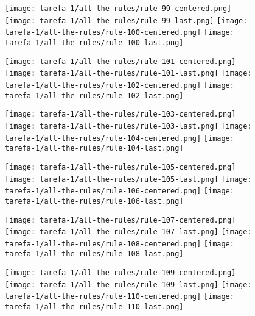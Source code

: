 \begin{figure}[htbp]
  \centering
\texttt{[image: tarefa-1/all-the-rules/rule-99-centered.png]}
\texttt{[image: tarefa-1/all-the-rules/rule-99-last.png]}
\texttt{[image: tarefa-1/all-the-rules/rule-100-centered.png]}
\texttt{[image: tarefa-1/all-the-rules/rule-100-last.png]}
\end{figure}
\begin{figure}[htbp]
  \centering
\texttt{[image: tarefa-1/all-the-rules/rule-101-centered.png]}
\texttt{[image: tarefa-1/all-the-rules/rule-101-last.png]}
\texttt{[image: tarefa-1/all-the-rules/rule-102-centered.png]}
\texttt{[image: tarefa-1/all-the-rules/rule-102-last.png]}
\end{figure}
\begin{figure}[htbp]
  \centering
\texttt{[image: tarefa-1/all-the-rules/rule-103-centered.png]}
\texttt{[image: tarefa-1/all-the-rules/rule-103-last.png]}
\texttt{[image: tarefa-1/all-the-rules/rule-104-centered.png]}
\texttt{[image: tarefa-1/all-the-rules/rule-104-last.png]}
\end{figure}
\begin{figure}[htbp]
  \centering
\texttt{[image: tarefa-1/all-the-rules/rule-105-centered.png]}
\texttt{[image: tarefa-1/all-the-rules/rule-105-last.png]}
\texttt{[image: tarefa-1/all-the-rules/rule-106-centered.png]}
\texttt{[image: tarefa-1/all-the-rules/rule-106-last.png]}
\end{figure}
\begin{figure}[htbp]
  \centering
\texttt{[image: tarefa-1/all-the-rules/rule-107-centered.png]}
\texttt{[image: tarefa-1/all-the-rules/rule-107-last.png]}
\texttt{[image: tarefa-1/all-the-rules/rule-108-centered.png]}
\texttt{[image: tarefa-1/all-the-rules/rule-108-last.png]}
\end{figure}
\begin{figure}[htbp]
  \centering
\texttt{[image: tarefa-1/all-the-rules/rule-109-centered.png]}
\texttt{[image: tarefa-1/all-the-rules/rule-109-last.png]}
\texttt{[image: tarefa-1/all-the-rules/rule-110-centered.png]}
\texttt{[image: tarefa-1/all-the-rules/rule-110-last.png]}
\end{figure}
